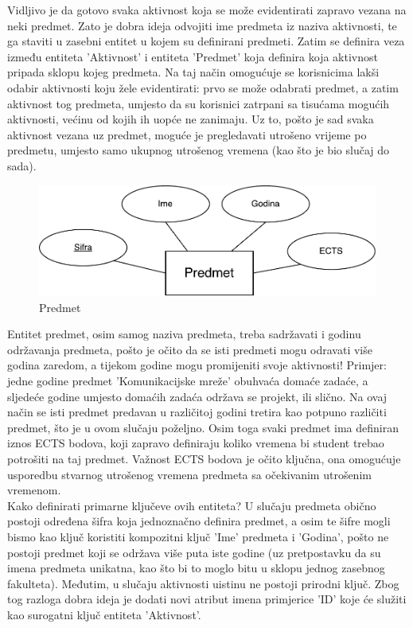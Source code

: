\documentclass[times, utf8, zavrsni]{fer}
\begin{document}
Vidljivo je da gotovo svaka aktivnost koja se može evidentirati zapravo vezana na neki predmet. Zato je dobra ideja odvojiti ime predmeta iz naziva aktivnosti, te ga staviti u zasebni entitet u kojem su definirani predmeti. Zatim se definira veza između entiteta 'Aktivnost' i entiteta 'Predmet' koja definira koja aktivnost pripada sklopu kojeg predmeta. Na taj način omogućuje se korisnicima lakši odabir aktivnosti koju žele evidentirati: prvo se može odabrati predmet, a zatim aktivnost tog predmeta, umjesto da su korisnici zatrpani sa tisućama mogućih aktivnosti, većinu od kojih ih uopće ne zanimaju. Uz to, pošto je sad svaka aktivnost vezana uz predmet, moguće je pregledavati utrošeno vrijeme po predmetu, umjesto samo ukupnog utrošenog vremena (kao što je bio slučaj do sada).\\

\begin{figure}[H]
\centering
\includegraphics[width=\textwidth,height=\textheight,keepaspectratio]{img/predmet.pdf}
\caption{Predmet}
\label{fig:predmet}
\end{figure}

Entitet predmet, osim samog naziva predmeta, treba sadržavati i godinu održavanja predmeta, pošto je očito da se isti predmeti mogu odravati više godina zaredom, a tijekom godine mogu promijeniti svoje aktivnosti! Primjer: jedne godine predmet 'Komunikacijske mreže' obuhvaća domaće zadaće, a sljedeće godine umjesto domaćih zadaća održava se projekt, ili slično. Na ovaj način se isti predmet predavan u različitoj godini tretira kao potpuno različiti predmet, što je u ovom slučaju poželjno. Osim toga svaki predmet ima definiran iznos ECTS bodova, koji zapravo definiraju koliko vremena bi student trebao potrošiti na taj predmet. Važnost ECTS bodova je očito ključna, ona omogućuje usporedbu stvarnog utrošenog vremena predmeta sa očekivanim utrošenim vremenom.\\

Kako definirati primarne ključeve ovih entiteta? U slučaju predmeta obično postoji određena šifra koja jednoznačno definira predmet, a osim te šifre mogli bismo kao ključ koristiti kompozitni ključ 'Ime' predmeta i 'Godina', pošto ne postoji predmet koji se održava više puta iste godine (uz pretpostavku da su imena predmeta unikatna, kao što bi to moglo bitu u sklopu jednog zasebnog fakulteta). Međutim, u slučaju aktivnosti uistinu ne postoji prirodni ključ. Zbog tog razloga dobra ideja je dodati novi atribut imena primjerice 'ID' koje će služiti kao surogatni ključ entiteta 'Aktivnost'.\\
\end{document}
